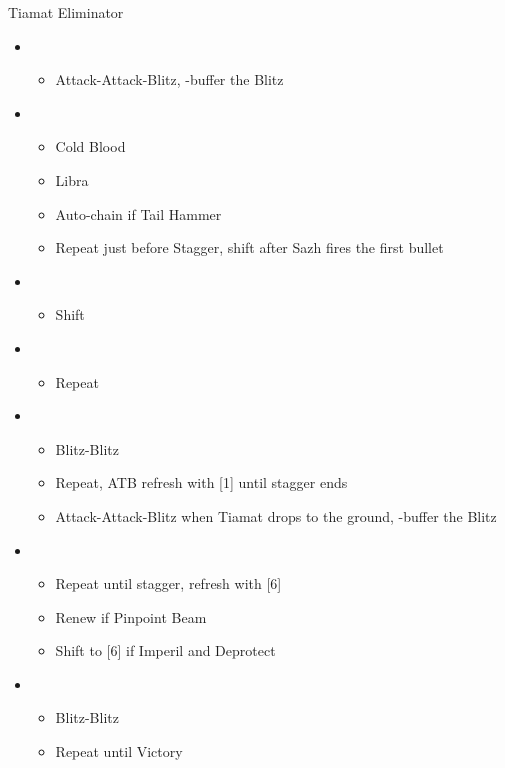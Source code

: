 \begin{battle}{Tiamat Eliminator}
\begin{multicols}{2}
\begin{itemize}
    \item \second
    \begin{itemize}
        \item Attack-Attack-Blitz, \rav-buffer the Blitz
    \end{itemize}
    \item \sixth
    \begin{itemize}
        \item Cold Blood
        \item Libra
        \item Auto-chain if Tail Hammer
        \item Repeat just before Stagger, shift after Sazh fires the first bullet
    \end{itemize}
    \item \fourth
    \begin{itemize}
        \item Shift
    \end{itemize}
    \item \sixth
    \begin{itemize}
        \item Repeat
    \end{itemize}
    \item \second
    \begin{itemize}
        \item Blitz-Blitz
        \item Repeat, ATB refresh with [1] until stagger ends
        \item Attack-Attack-Blitz when Tiamat drops to the ground, \rav-buffer the Blitz
    \end{itemize}
    \columnbreak
    \item \fifth
    \begin{itemize}
        \item Repeat until stagger, refresh with [6]
        \item Renew if Pinpoint Beam
        \item Shift to [6] if Imperil and Deprotect
    \end{itemize}
    \item \second
    \begin{itemize}
        \item Blitz-Blitz
        \item Repeat until Victory
    \end{itemize}
\end{itemize}
\end{multicols}
\end{battle}

